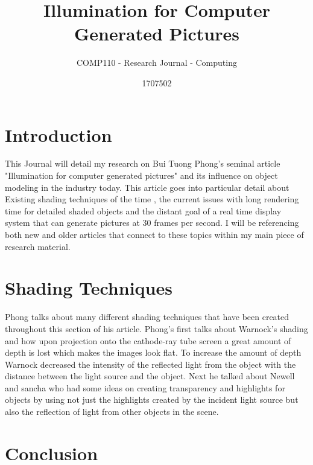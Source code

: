\documentclass{scrartcl}
\title{Illumination for Computer Generated Pictures}
\subtitle{COMP110 - Research Journal - Computing}
\author{1707502}
\begin{document}
\maketitle


\section{Introduction}

This Journal will detail my research on Bui Tuong Phong's seminal article "Illumination for computer generated pictures" and its influence on object modeling in the industry today. This article goes into particular detail about Existing shading techniques of the time , the current issues with long rendering time for detailed shaded objects and the distant goal of a real time display system that can generate pictures at 30 frames per second. I will be referencing both new and older articles that connect to these topics within my main piece of research material. 

\section{Shading Techniques}

Phong talks about many different shading techniques that have been created throughout this section of his article. Phong’s first talks about Warnock’s shading and how upon projection onto the cathode-ray tube screen a great amount of depth is lost which makes the images look flat. To increase the amount of depth Warnock decreased the intensity of the reflected light from the object with the distance between the light source and the object.  Next he talked about Newell and sancha who had some ideas on creating transparency and highlights for objects by using not just the highlights created by the incident light source but also the reflection of light from other objects in the scene. 
\cite{Phong}

\section{Conclusion}





\end{document}

